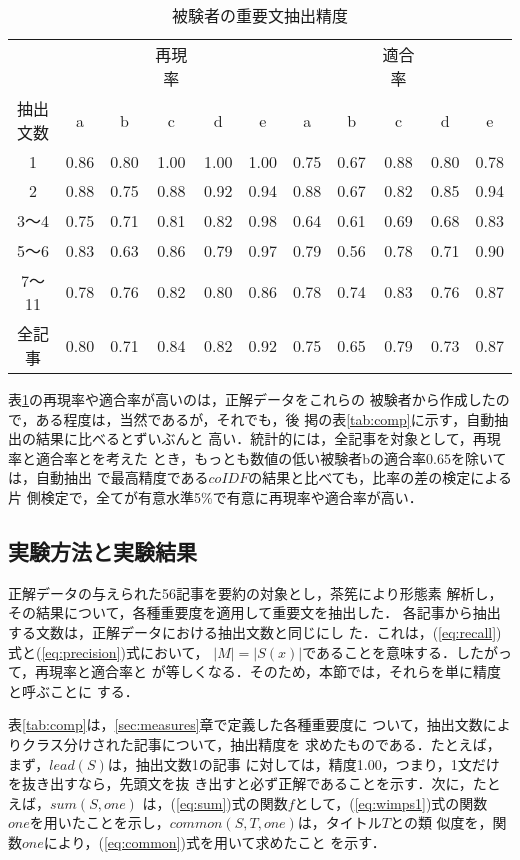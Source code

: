 \begin{table}[htbp]
  \caption{被験者の重要文抽出精度}
  \begin{center}
    \begin{tabular}{|c|ccccc|ccccc|}\hline
         &     & &再現率&    &    &    &    &適合率&  &\\ \cline{2-11}
抽出文数 & a  &b   &c   &d   &e   &a   &b   &c   &d   &e\\\hline
1        &0.86&0.80&1.00&1.00&1.00&0.75&0.67&0.88&0.80&0.78\\
2        &0.88&0.75&0.88&0.92&0.94&0.88&0.67&0.82&0.85&0.94\\
3〜4     &0.75&0.71&0.81&0.82&0.98&0.64&0.61&0.69&0.68&0.83\\
5〜6     &0.83&0.63&0.86&0.79&0.97&0.79&0.56&0.78&0.71&0.90\\
7〜11    &0.78&0.76&0.82&0.80&0.86&0.78&0.74&0.83&0.76&0.87\\\hline
全記事   &0.80&0.71&0.84&0.82&0.92&0.75&0.65&0.79&0.73&0.87\\\hline
    \end{tabular}
    \label{tab:sbj}
  \end{center}
\end{table}

表\ref{tab:sbj}の再現率や適合率が高いのは，正解データをこれらの
被験者から作成したので，ある程度は，当然であるが，それでも，後
掲の表\ref{tab:comp}に示す，自動抽出の結果に比べるとずいぶんと
高い．統計的には，全記事を対象として，再現率と適合率とを考えた
とき，もっとも数値の低い被験者bの適合率0.65を除いては，自動抽出
で最高精度である$coIDF$の結果と比べても，比率の差の検定による片
側検定で，全てが有意水準5\%で有意に再現率や適合率が高い．

\subsection{実験方法と実験結果}
\label{sec:results}

正解データの与えられた56記事を要約の対象とし，茶筅により形態素
解析し，その結果について，各種重要度を適用して重要文を抽出した．
各記事から抽出する文数は，正解データにおける抽出文数と同じにし
た．これは，(\ref{eq:recall})式と(\ref{eq:precision})式において，
$|M|=|S(x)|$であることを意味する．したがって，再現率と適合率と
が等しくなる．そのため，本節では，それらを単に精度と呼ぶことに
する．

表\ref{tab:comp}は，\ref{sec:measures}章で定義した各種重要度に
ついて，抽出文数によりクラス分けされた記事について，抽出精度を
求めたものである．たとえば，まず，$lead(S)$は，抽出文数1の記事
に対しては，精度1.00，つまり，1文だけを抜き出すなら，先頭文を抜
き出すと必ず正解であることを示す．次に，たとえば，$sum(S,one)$
は，(\ref{eq:sum})式の関数$f$として，(\ref{eq:wimps1})式の関数
$one$を用いたことを示し，$common(S,T,one)$は，タイトル$T$との類
似度を，関数$one$により，(\ref{eq:common})式を用いて求めたこと
を示す．

